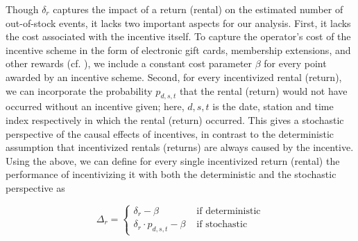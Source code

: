 Though $\delta_r$ captures the impact of a return (rental) on the estimated number of out-of-stock events, it lacks two important aspects for our analysis. First, it lacks the cost associated with the incentive itself. To capture the operator's cost of the incentive scheme in the form of electronic gift cards, membership extensions, and other rewards (cf. \cite{bikeangels}), we include a constant cost parameter $\beta$ for every point awarded by an incentive scheme. Second, for every incentivized rental (return), we can incorporate the probability $p_{d,s,t}$ that the rental (return) would not have occurred without an incentive given; here, $d, s, t$ is the date, station and time index respectively in which the rental (return) occurred. This gives a stochastic perspective of the causal effects of incentives, in contrast to the deterministic assumption that incentivized rentals (returns) are always caused by the incentive. Using the above, we can define for every single incentivized return (rental) the performance of incentivizing it with both the deterministic and the stochastic perspective as %



\begin{equation}
    \Delta_r=
    \begin{cases}
       \delta_{r} - \beta & \text{ if deterministic}\\
       \delta_{r} \cdot p_{d,s,t}  - \beta & \text{ if stochastic}
    \end{cases}
\end{equation} 

